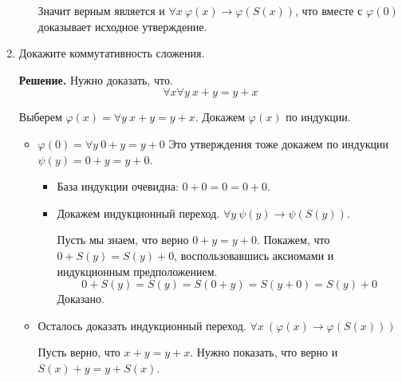 \begin{enumerate}
\begin{enumerate}
Значит верным является и $\forall x \ \varphi(x) \to \varphi(S(x))$, что вместе с $\varphi(0)$ доказывает 
исходное утверждение.
\end{enumerate}

\item Докажите коммутативность сложения.

\textbf{Решение.} Нужно доказать, что.
\begin{equation*}
\forall x \forall y \ x + y = y + x
\end{equation*}

Выберем $\varphi(x) = \forall y \ x + y = y + x$. Докажем $\varphi(x)$ по индукции.

\begin{itemize}
	\item $\varphi(0) = \forall y \ 0 + y = y + 0$ Это утверждения тоже докажем по индукции $\psi(y) = 0 + y = y 
	+ 0$.
	\begin{itemize}
		\item База индукции очевидна: $0 + 0 = 0 = 0 + 0$.
		
		\item Докажем индукционный переход. $\forall y \ \psi(y) \to \psi(S(y))$.
		
		Пусть мы знаем, что верно $0 + y = y + 0$. Покажем, что $0 + S(y) = S(y) + 0$, воспользовавшись аксиомами 
		и индукционным предположением.
		\begin{equation*}
		0 + S(y) = S(y) = S(0 + y) = S(y + 0) = S(y) + 0
		\end{equation*}
		Доказано.
	\end{itemize}

	\item Осталось доказать индукционный переход. $\forall x \ (\varphi(x) \to \varphi(S(x)))$
	
	Пусть верно, что $x + y = y + x$. Нужно показать, что верно и $S(x) + y = y + S(x)$.
	

\end{itemize}
\end{enumerate}
